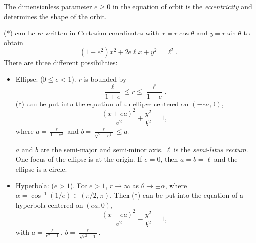 \documentclass[a4paper]{article}
\begin{document}
\begin{defi}[Eccentricity]
  The dimensionless parameter $e \geq 0$ in the equation of orbit is the \emph{eccentricity} and determines the shape of the orbit.
\end{defi}

($*$) can be re-written in Cartesian coordinates with $x = r\cos \theta$ and $y = r\sin \theta$ to obtain
\[
  (1 - e^2)x^2 + 2e\ell x + y^2 = \ell^2.\tag{$\dagger$}
\]
There are three different possibilities:
\begin{itemize}
  \item Ellipse: ($0\leq e < 1$). $r$ is bounded by
    \[
      \frac{\ell}{1 + e} \leq r \leq \frac{\ell}{1 - e}.
    \]
    ($\dagger$) can be put into the equation of an ellipse centered on $(-ea, 0)$,
    \[
      \frac{(x + ea)^2}{a^2} + \frac{y^2}{b^2} = 1,
    \]
    where $\displaystyle a = \frac{\ell}{1 - e^2}$ and $\displaystyle b = \frac{\ell}{\sqrt{1 - e^2}}\leq a$.
    \begin{center}
    \end{center}

    $a$ and $b$ are the semi-major and semi-minor axis. $\ell$ is the \emph{semi-latus rectum}. One focus of the ellipse is at the origin. If $e = 0$, then $a = b = \ell$ and the ellipse is a circle.

  \item Hyperbola: ($e > 1$). For $e > 1$, $r\to \infty$ as $\theta \to \pm \alpha$, where $\alpha = \cos^{-1}(1/e)\in (\pi/2, \pi)$. Then ($\dagger$) can be put into the equation of a hyperbola centered on $(ea, 0)$,
    \[
      \frac{(x - ea)^2}{a^2} - \frac{y^2}{b^2} = 1,
    \]
    with $\displaystyle a = \frac{\ell}{e^2 - 1}$, $\displaystyle b = \frac{\ell}{\sqrt{e^2 - 1}}$.


\end{itemize}
\end{document}
